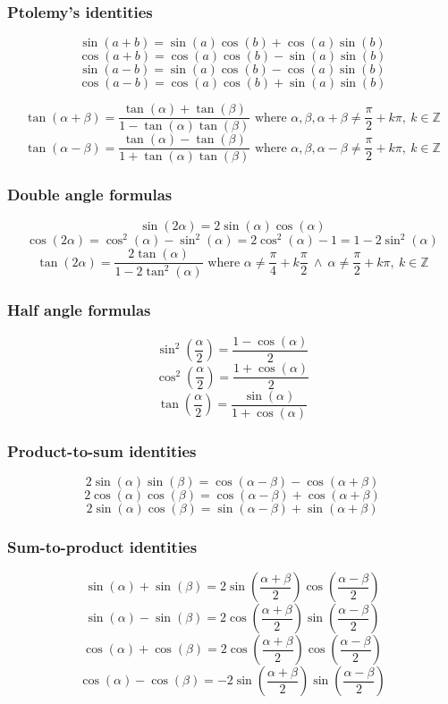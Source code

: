 \subsubsection{Ptolemy's identities}
\[
\sin(a+b)=\sin(a)\cos(b)+\cos(a)\sin(b)
\]
\[
\cos(a+b)=\cos(a)\cos(b)-\sin(a)\sin(b)
\]
\[
\sin(a-b)=\sin(a)\cos(b)-\cos(a)\sin(b)
\]
\[
\cos(a-b)=\cos(a)\cos(b)+\sin(a)\sin(b)
\]

\[
\tan(\alpha+\beta)=\frac{\tan(\alpha) + \tan(\beta)}{1-\tan(\alpha)\tan(\beta)} \text{ where } \alpha, \beta, \alpha+\beta \ne \frac{\pi}{2} + k\pi, \ k \in \mathbb{Z}
\]
\[
\tan(\alpha-\beta)=\frac{\tan(\alpha) - \tan(\beta)}{1+\tan(\alpha)\tan(\beta)} \text{ where } \alpha, \beta, \alpha-\beta \ne \frac{\pi}{2} + k\pi, \ k \in \mathbb{Z}
\]

\subsubsection{Double angle formulas}
\[
\sin(2\alpha) = 2\sin(\alpha)\cos(\alpha)
\]
\[
\cos(2\alpha)=\cos^2(\alpha)-\sin^2(\alpha) = 2\cos^2(\alpha)-1 = 1 - 2\sin^2(\alpha)
\]
\[
\tan(2\alpha) = \frac{2\tan(\alpha)}{1-2\tan^2(\alpha)} \text{ where } \alpha \ne \frac{\pi}{4}+k\frac{\pi}{2} \ \wedge \ \alpha \ne \frac{\pi}{2}+k\pi, \ k \in \mathbb{Z}
\]

\subsubsection{Half angle formulas}
\[
\sin^2\left(\frac{\alpha}{2}\right) = \frac{1-\cos(\alpha)}{2}
\]
\[
\cos^2\left(\frac{\alpha}{2}\right) = \frac{1+\cos(\alpha)}{2}
\]
\[
\tan\left(\frac{\alpha}{2}\right) = \frac{\sin(\alpha)}{1+\cos(\alpha)}
\]

\subsubsection{Product-to-sum identities}
\[
2\sin(\alpha)\sin(\beta) = \cos(\alpha-\beta) - \cos(\alpha+\beta)
\]
\[
2\cos(\alpha)\cos(\beta) = \cos(\alpha-\beta) + \cos(\alpha+\beta)
\]
\[
2\sin(\alpha)\cos(\beta) = \sin(\alpha-\beta) + \sin(\alpha+\beta)
\]

\subsubsection{Sum-to-product identities}
\[
\sin(\alpha)+\sin(\beta) = 2\sin\left(\frac{\alpha+\beta}{2}\right)\cos\left(\frac{\alpha-\beta}{2}\right)
\]
\[
\sin(\alpha)-\sin(\beta) = 2\cos\left(\frac{\alpha+\beta}{2}\right)\sin\left(\frac{\alpha-\beta}{2}\right)
\]
\[
\cos(\alpha)+\cos(\beta) = 2\cos\left(\frac{\alpha+\beta}{2}\right)\cos\left(\frac{\alpha-\beta}{2}\right)
\]
\[
\cos(\alpha)-\cos(\beta) = -2\sin\left(\frac{\alpha+\beta}{2}\right)\sin\left(\frac{\alpha-\beta}{2}\right)
\]

